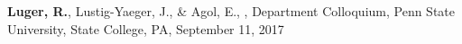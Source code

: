 \item\textbf{Luger, R.}, Lustig-Yaeger, J., \& Agol, E., , Department Colloquium, Penn State University, State College, PA, September 11, 2017